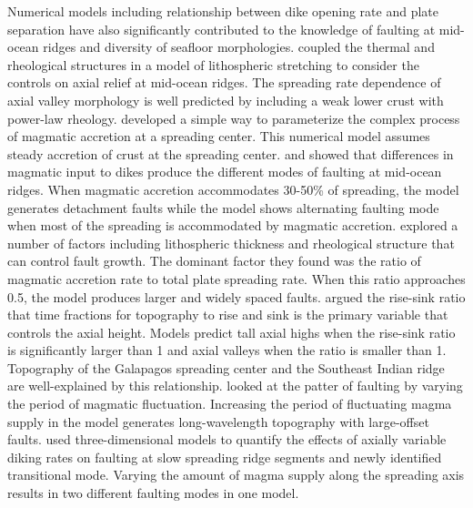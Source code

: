 \documentclass[letterpaper,12pt,notitle]{memphisthesis}                     %
\begin{document}
Numerical models including relationship between dike opening rate and plate separation have also significantly contributed to the knowledge of faulting at mid-ocean ridges and diversity of seafloor morphologies. %
\citet{Chen1990} coupled the thermal and rheological structures in a model of lithospheric stretching to consider the controls on axial relief at mid-ocean ridges. The spreading rate dependence of axial valley morphology is well predicted by including a weak lower crust with power-law rheology. \citet{Buck1998} developed a simple way to parameterize the complex process of magmatic accretion at a spreading center. This numerical model assumes steady accretion of crust at the spreading center. \citet{Buck2005} and \citet{Tucholke2008} showed that differences in magmatic input to dikes produce the different modes of faulting at mid-ocean ridges. When magmatic accretion accommodates 30-50\% of spreading, the model generates detachment faults while the model shows alternating faulting mode when most of the spreading is accommodated by magmatic accretion. 
\citet{Behn2008} explored a number of factors including lithospheric thickness and rheological structure that can control fault growth. The dominant factor they found was the ratio of magmatic accretion rate to total plate spreading rate. When this ratio approaches 0.5, the model produces larger and widely spaced faults.
\citet{Ito2008} argued the rise-sink ratio that time fractions for topography to rise and sink is the primary variable that controls the axial height. Models predict tall axial highs when the rise-sink ratio is significantly larger than 1 and axial valleys when the ratio is smaller than 1. Topography of the Galapagos spreading center and the Southeast Indian ridge are well-explained by this relationship.
\citet{Olive2015} looked at the patter of faulting by varying the period of magmatic fluctuation. Increasing the period of fluctuating magma supply in the model generates long-wavelength topography with large-offset faults.
\citet{Tian2017} used three-dimensional models to quantify the effects of axially variable diking rates on faulting at slow spreading ridge segments and newly identified transitional mode. Varying the amount of magma supply along the spreading axis results in two different faulting modes in one model.
\end{document}
